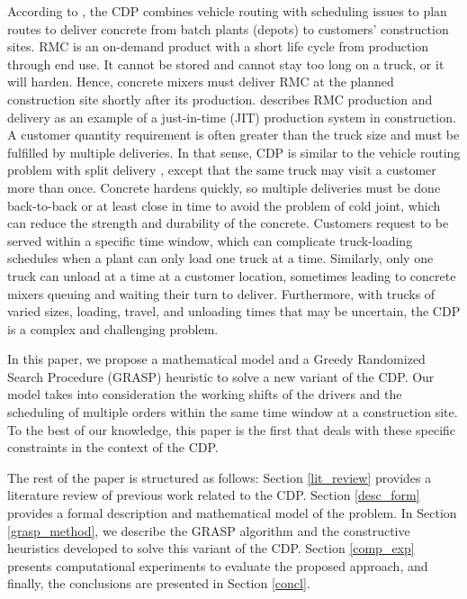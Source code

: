 \documentclass{article}
\begin{document}
According to \cite{blazewicz2019handbook}, the CDP combines vehicle routing with scheduling issues to plan routes to deliver concrete from batch plants (depots) to customers' construction sites. RMC is an on-demand product with a short life cycle from production through end use. It cannot be stored and cannot stay too long on a truck, or it will harden. Hence, concrete mixers must deliver RMC at the planned construction site shortly after its production. \cite{tommelein1999just} describes RMC production and delivery as an example of a just-in-time (JIT) production system in construction. A customer quantity requirement is often greater than the truck size and must be fulfilled by multiple deliveries. In that sense, CDP is similar to the vehicle routing problem with split delivery \citep{archetti2008split}, except that the same truck may visit a customer more than once. Concrete hardens quickly, so multiple deliveries must be done back-to-back or at least close in time to avoid the problem of cold joint, which can reduce the strength and durability of the concrete. Customers request to be served within a specific time window, which can complicate truck-loading schedules when a plant can only load one truck at a time. Similarly, only one truck can unload at a time at a customer location, sometimes leading to concrete mixers queuing and waiting their turn to deliver. Furthermore, with trucks of varied sizes, loading, travel, and unloading times that may be uncertain, the CDP is a complex and challenging problem.

In this paper, we propose a mathematical model and a Greedy Randomized Search Procedure (GRASP) heuristic to solve a new variant of the CDP. Our model takes into consideration the working shifts of the drivers and the scheduling of multiple orders within the same time window at a construction site. To the best of our knowledge, this paper is the first that deals with these specific constraints in the context of the CDP.

The rest of the paper is structured as follows: Section \ref{lit_review} provides a literature review of previous work related to the CDP. Section \ref{desc_form} provides a formal description and mathematical model of the problem. In Section \ref{grasp_method}, we describe the GRASP algorithm and the constructive heuristics developed to solve this variant of the CDP. Section \ref{comp_exp} presents computational experiments to evaluate the proposed approach, and finally, the conclusions are presented in Section \ref{concl}.
\end{document}

